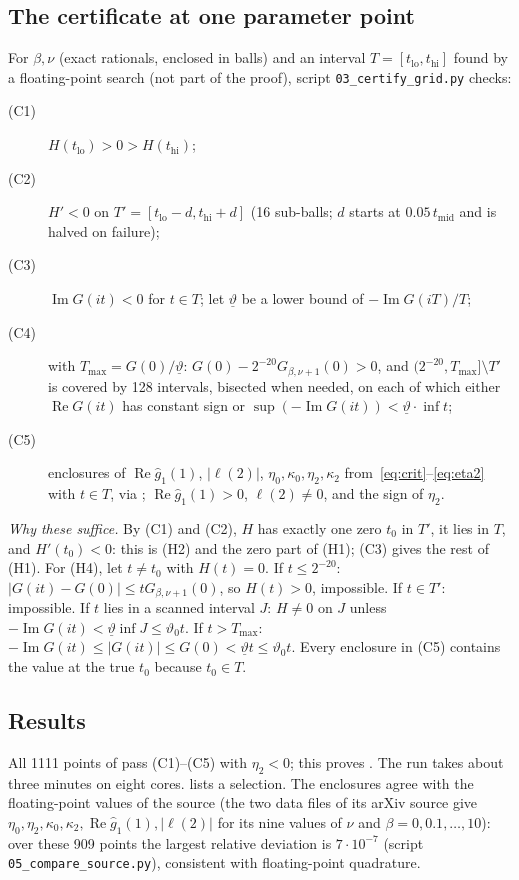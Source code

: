 \documentclass[11pt,a4paper]{report}
\newcommand{\vth}{\vartheta}
\newcommand{\gh}{\hat g}
\begin{document}
\subsection{The certificate at one parameter point}\label{subsec:cert}
For $\beta,\nu$ (exact rationals, enclosed in balls) and an interval $T=[t_{\mathrm{lo}},t_{\mathrm{hi}}]$ found by a floating-point search (not part of the proof), script \texttt{03\_certify\_grid.py} checks:
\begin{description}
\item[(C1)] $H(t_{\mathrm{lo}})>0>H(t_{\mathrm{hi}})$;
\item[(C2)] $H'<0$ on $T'=[t_{\mathrm{lo}}-d,t_{\mathrm{hi}}+d]$ (16 sub-balls; $d$ starts at $0.05\,t_{\mathrm{mid}}$ and is halved on failure);
\item[(C3)] $\operatorname{Im}G(it)<0$ for $t\in T$; let $\underline\vth$ be a lower bound of $-\operatorname{Im}G(iT)/T$;
\item[(C4)] with $T_{\max}=G(0)/\underline\vth$: $G(0)-2^{-20}G_{\beta,\nu+1}(0)>0$, and $(2^{-20},T_{\max}]\setminus T'$ is covered by 128 intervals, bisected when needed, on each of which either $\operatorname{Re}G(it)$ has constant sign or $\sup(-\operatorname{Im}G(it))<\underline\vth\cdot\inf t$;
\item[(C5)] enclosures of $\operatorname{Re}\gh_1(1)$, $|\ell(2)|$, $\eta_0,\kappa_0,\eta_2,\kappa_2$ from~\eqref{eq:crit}--\eqref{eq:eta2} with $t\in T$, via ; $\operatorname{Re}\gh_1(1)>0$, $\ell(2)\ne0$, and the sign of $\eta_2$.
\end{description}
\emph{Why these suffice.} By (C1) and (C2), $H$ has exactly one zero $t_0$ in $T'$, it lies in $T$, and $H'(t_0)<0$: this is (H2) and the zero part of (H1); (C3) gives the rest of (H1). For (H4), let $t\neq t_0$ with $H(t)=0$. If $t\le2^{-20}$: $|G(it)-G(0)|\le tG_{\beta,\nu+1}(0)$, so $H(t)>0$, impossible. If $t\in T'$: impossible. If $t$ lies in a scanned interval $J$: $H\ne0$ on $J$ unless $-\operatorname{Im}G(it)<\underline\vth\inf J\le\vth_0t$. If $t>T_{\max}$: $-\operatorname{Im}G(it)\le|G(it)|\le G(0)<\underline\vth t\le\vth_0t$. Every enclosure in (C5) contains the value at the true $t_0$ because $t_0\in T$.

\subsection{Results}\label{subsec:compare}
All 1111 points of  pass (C1)--(C5) with $\eta_2<0$; this proves . The run takes about three minutes on eight cores.  lists a selection. The enclosures agree with the floating-point values of the source (the two data files of its arXiv source give $\eta_0,\eta_2,\kappa_0,\kappa_2,\operatorname{Re}\gh_1(1),|\ell(2)|$ for its nine values of $\nu$ and $\beta=0,0.1,\dots,10$): over these 909 points the largest relative deviation is $7\cdot10^{-7}$ (script \texttt{05\_compare\_source.py}), consistent with floating-point quadrature.
\end{document}
